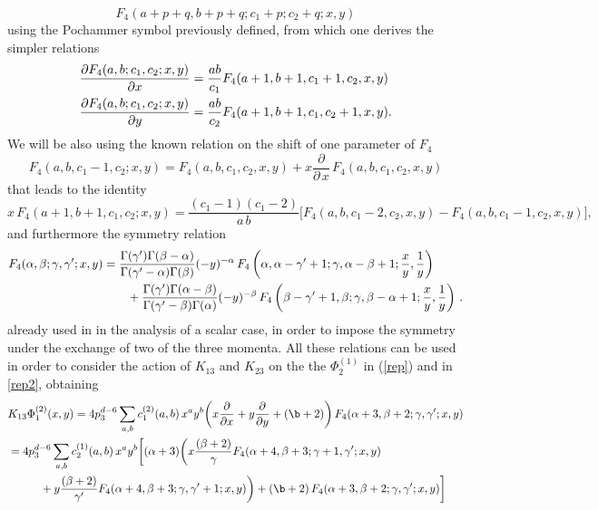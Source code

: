 \documentclass[a4paper,11pt,openright,twoside]{book}
\numberwithin{equation}{section}
\begin{document}
{{\begin{equation}
F_4(a + p + q,b + p + q; c_1 + p ; c_2 + q;x,y)
\end{equation}
using the Pochammer symbol previously defined, from which one derives the simpler relations 
\begin{align}
& \frac{\partial F_4(a,b;c_1,c_2;x,y)}{\partial x} =\frac{a b}{c_1}F_4(a+1,b+1,c_1+1,c_2,x,y) \notag\\
&  \frac{\partial F_4(a,b;c_1,c_2;x,y)}{\partial y} =\frac{a b}{c_2}F_4(a+1,b+1,c_1,c_2 +1,x,y).
\end{align} 
We will be also using the known relation on the shift of one parameter of $F_4$
\begin{equation}
\label{exs}
F_4(a,b,c_1-1,c_2;x,y)=F_4(a,b,c_1,c_2,x,y)+x\frac{\partial}{\partial\,x}\,F_4(a,b,c_1,c_2,x,y)
\end{equation}
that leads to the identity
\begin{equation}
x\,F_4(a+1,b+1,c_1,c_2;x,y)=\frac{(c_1-1)(c_1-2)}{a\,b}\bigg[F_4(a,b,c_1-2,c_2,x,y)-F_4(a,b,c_1-1,c_2,x,y)\bigg],
\end{equation}
and furthermore the symmetry relation 
\begin{align}
\label{transfF4}
F_4(\alpha, \beta; \gamma, \gamma'; x, y) &= \frac{\Gamma(\gamma') \Gamma(\beta - \alpha)}{ \Gamma(\gamma' - \alpha) \Gamma(\beta)} (- y)^{- \alpha} \, F_4\left(\alpha, \alpha -\gamma' +1; \gamma, \alpha-\beta +1; \frac{x}{y}, \frac{1}{y}\right) \notag\\
%
&\qquad+  \frac{\Gamma(\gamma') \Gamma(\alpha - \beta)}{ \Gamma(\gamma' - \beta) \Gamma(\alpha)} (- y)^{- \beta} \, F_4\left(\beta -\gamma' +1, \beta ; \gamma, \beta-\alpha +1; \frac{x}{y}, \frac{1}{y}\right) \,.
\end{align}
already used in \cite{Coriano:2013jba} in the analysis of a scalar case, in order to impose the symmetry under the exchange of two of the three momenta. 
All these relations can be used in order to consider the action of $K_{13}$ and $K_{23}$ on the the $\Phi_2^{(1)}$  in (\ref{rep}) and in \eqref{rep2}, obtaining 
\begin{align}
&K_{13}\Phi_1^{(2)}(x,y) = 4p_3^{d -6} \sum_{a,b} c^{(2)}_1(a,b)\,x^a y^b\bigg(x\frac{\partial}{\partial x} +y\frac{\partial}{\partial y} +(\b+2)\bigg)\,F_4(\alpha +3, \beta+2; \gamma, \gamma' ; x, y)   \notag\\
&= 4 p_3^{d -6} \sum_{a,b} c^{(1)}_2(a,b)\,x^a y^b\bigg[ (\alpha+3)\bigg(x\frac{(\beta+2)}{\gamma}F_4(\alpha +4, \beta+3; \gamma+1, \gamma'; x, y)\notag\\
&\hspace{1cm}+y\frac{(\beta+2)}{\gamma'}F_4(\alpha +4, \beta+3; \gamma, \gamma'+1; x, y)\bigg)+(\b+2)\,F_4(\alpha +3, \beta+2; \gamma, \gamma'; x, y) \bigg]

\end{align}}}
\end{document}
